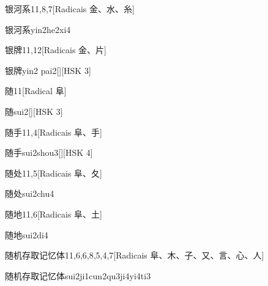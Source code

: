 \begin{entry}{银河系}{11,8,7}[Radicais ⾦、⽔、⽷]
  \begin{phonetics}{银河系}{yin2he2xi4}
  \end{phonetics}
\end{entry}

\begin{entry}{银牌}{11,12}[Radicais ⾦、⽚]
  \begin{phonetics}{银牌}{yin2 pai2}[][HSK 3]
  \end{phonetics}
\end{entry}

\begin{entry}{随}{11}[Radical ⾩]
  \begin{phonetics}{随}{sui2}[][HSK 3]
  \end{phonetics}
\end{entry}

\begin{entry}{随手}{11,4}[Radicais ⾩、⼿]
  \begin{phonetics}{随手}{sui2shou3}[][HSK 4]
  \end{phonetics}
\end{entry}

\begin{entry}{随处}{11,5}[Radicais ⾩、⼡]
  \begin{phonetics}{随处}{sui2chu4}
  \end{phonetics}
\end{entry}

\begin{entry}{随地}{11,6}[Radicais ⾩、⼟]
  \begin{phonetics}{随地}{sui2di4}
  \end{phonetics}
\end{entry}

\begin{entry}{随机存取记忆体}{11,6,6,8,5,4,7}[Radicais ⾩、⽊、⼦、⼜、⾔、⼼、⼈]
  \begin{phonetics}{随机存取记忆体}{sui2ji1cun2qu3ji4yi4ti3}
  \end{phonetics}
\end{entry}

